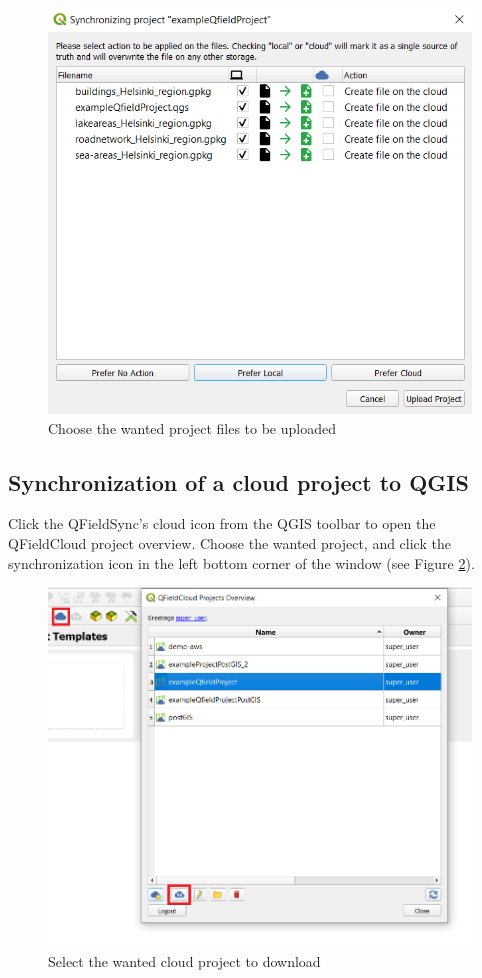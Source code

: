 \documentclass{article}
\begin{document}
\begin{figure}[H]
    \centering
    \includegraphics[width=1\textwidth]{qgis-create-empty-project-1.png}
    \caption{Choose the wanted project files to be uploaded}
    \label{fig:qgis-create-cloud-project-1}
\end{figure}

\subsection{Synchronization of a cloud project to QGIS}

Click the QFieldSync's cloud icon from the QGIS toolbar to open the QFieldCloud project overview. Choose the wanted project, and click the synchronization icon in the left bottom corner of the window (see Figure \ref{fig:download}).

\begin{figure}[H]
    \centering
    \includegraphics[width=1\textwidth]{download-project.png}
    \caption{Select the wanted cloud project to download}
    \label{fig:download}
\end{figure}
\end{document}
